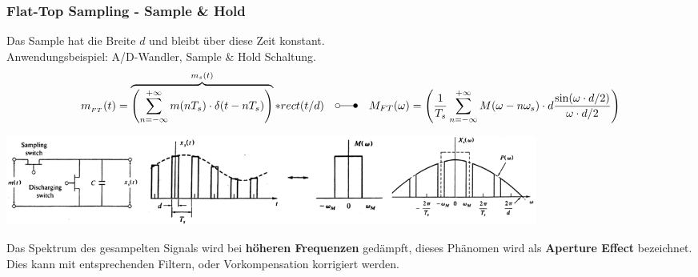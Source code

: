 \subsubsection{Flat-Top Sampling - Sample \& Hold }
Das Sample hat die Breite $d$ und bleibt über diese Zeit konstant. \\
Anwendungsbeispiel: A/D-Wandler, Sample \& Hold Schaltung. \\
	\begin{equation*}
		m_{_{FT}}(t) = \overbrace{\left( \sum_{n=-\infty}^{+\infty} m(nT_s) \cdot \delta(t-nT_s)\right)}^{m_s(t)} \ast rect(t/d)
		\quad \laplace \quad
		M_{FT}(\omega) =\left(\frac{1}{T_s} \sum_{n=-\infty}^{+\infty} M(\omega -n\omega_s)\cdot d \frac{\sin(\omega \cdot d/2)}{\omega\cdot d/2}\right)
	\end{equation*}
	\begin{center}
		\includegraphics[width=17.5cm]{bilder/dig_flattopsampling.png}
	\end{center}
Das Spektrum des gesampelten Signals wird bei \textbf{höheren Frequenzen} gedämpft, dieses Phänomen
wird als \textbf{Aperture Effect} bezeichnet. Dies kann mit entsprechenden Filtern, oder Vorkompensation 
korrigiert werden.\\
\\

